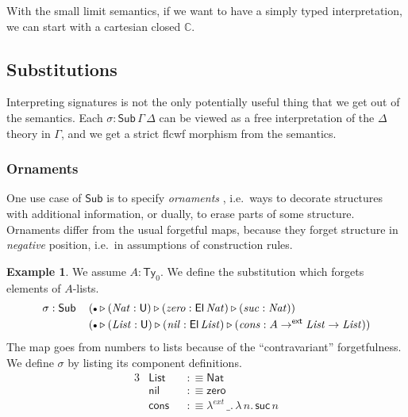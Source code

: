 \documentclass[12pt,a4paper,twoside,openany]{book}
\theoremstyle{remark}
\theoremstyle{definition}
\newtheorem{myexample}{Example}
\theoremstyle{theorem}
\newcommand{\mi}[1]{\mathit{#1}}
\newcommand{\ms}[1]{\mathsf{#1}}
\newcommand{\mbb}[1]{\mathbb{#1}}
\newcommand{\Sub}{\mathsf{Sub}}
\newcommand{\Ty}{\mathsf{Ty}}
\newcommand{\U}{\mathsf{U}}
\newcommand{\El}{\mathsf{El}}
\newcommand{\ext}{\triangleright}
\newcommand{\emptycon}{\scaleobj{.75}\bullet}
\newcommand{\toe}{\to^{\ms{ext}}}
\newcommand{\mbbC}{\mbb{C}}
\newcommand{\defn}{:\equiv}
\begin{document}
With the small limit semantics, if we want to have a simply typed
interpretation, we can start with a cartesian closed $\mbbC$.

\subsection{Substitutions}

Interpreting signatures is not the only potentially useful thing that we get out
of the semantics. Each $\sigma : \Sub\,\Gamma\,\Delta$ can be viewed as a free
interpretation of the $\Delta$ theory in $\Gamma$, and we get a strict flcwf
morphism from the semantics.

\subsubsection{Ornaments}

One use case of $\Sub$ is to specify \emph{ornaments} \cite{ornaments}, i.e.\ ways
to decorate structures with additional information, or dually, to erase parts of
some structure. Ornaments differ from the usual forgetful maps, because they
forget structure in \emph{negative} position, i.e.\ in assumptions of
construction rules.

\begin{myexample}
We assume $A : \Ty_0$. We define the substitution which forgets elements of
$A$-lists.
\begin{alignat*}{3}
  & \sigma : \Sub\,&&
  (\emptycon \ext (\mi{Nat} : \U) \ext (\mi{zero} : \El\,\mi{Nat}) \ext (\mi{suc} : \mi{Nat}))\\
  & &&(\emptycon \ext (\mi{List} : \U) \ext (\mi{nil} : \El\,\mi{List}) \ext (\mi{cons} : A \toe \mi{List} \to \mi{List}))
\end{alignat*}
The map goes from numbers to lists because of the ``contravariant''
forgetfulness. We define $\sigma$ by listing its component definitions.
\begin{alignat*}{3}
  &\ms{List} &&\defn \ms{Nat}\\
  &\ms{nil} &&\defn \ms{zero}\\
  &\ms{cons} &&\defn \lambda^{ext}\,\_.\,\lambda\,n.\,\ms{suc}\,n
\end{alignat*}
\end{myexample}
\end{document}
